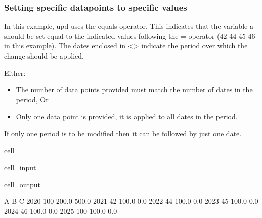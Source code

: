 \documentclass[letterpaper,10pt,english]{jupyterBook}
\begin{document}
\subsubsection{Setting specific datapoints to specific values}
\label{\detokenize{content/howto/update/model update:setting-specific-datapoints-to-specific-values}}
\sphinxAtStartPar
In this example, upd uses the equals operator.  This indicates that the variable a should be set equal to the indicated values following the = operator (42 44 45 46 in this example). The dates enclosed in <> indicate the period over which the change should be applied.

\sphinxAtStartPar
Either:
\begin{itemize}
\item {} 
\sphinxAtStartPar
The number of data points provided must match the number of dates in the period, Or

\item {} 
\sphinxAtStartPar
Only one data point is provided, it is applied to all dates in the period.

\end{itemize}

\sphinxAtStartPar
If only one period is to be modified then it can be followed by just one date.

\begin{sphinxuseclass}{cell}\begin{sphinxVerbatimInput}

\begin{sphinxuseclass}{cell_input}
\begin{sphinxVerbatim}[commandchars=\\\{\}]
\end{sphinxVerbatim}

\end{sphinxuseclass}\end{sphinxVerbatimInput}
\begin{sphinxVerbatimOutput}

\begin{sphinxuseclass}{cell_output}
\begin{sphinxVerbatim}[commandchars=\\\{\}]
        A      B      C
2020  100  200.0  500.0
2021   42  100.0    0.0
2022   44  100.0    0.0
2023   45  100.0    0.0
2024   46  100.0    0.0
2025  100  100.0    0.0
\end{sphinxVerbatim}

\end{sphinxuseclass}\end{sphinxVerbatimOutput}

\end{sphinxuseclass}
\end{document}
